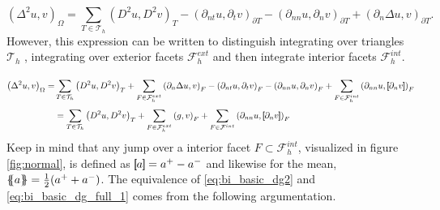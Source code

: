 \begin{equation}
\label{eq:bi_basic_dg2}
\left( \Delta  ^{2} u,v \right) _{\Omega } = \sum_{T \in  \mathcal{T} _{h}}^{}  \left( D^2u,D^2v \right) _{T } - \left(\partial _{nt} u, \partial _{t}v
\right)_{\partial T} - \left(\partial _{nn} u, \partial _{n}v \right)_{\partial T} + \left(\partial _{n} \Delta  u,v
\right)_{\partial T}.
\end{equation}
However, this expression can be written to distinguish integrating over triangles $\mathcal{T} _{h}$ , integrating over exterior facets $\mathcal{F} _{h}^{ext}$ and then integrate interior facets $\mathcal{F} _{h}^{int}$.

\begin{equation}
\label{eq:bi_basic_dg_full_1}
\begin{split}
\left( \Delta  ^{2} u, v \right) _{\Omega } =& \sum_{T \in  \mathcal{T} _{h}}^{} \left( D^2u, D^2v \right)_{T}  + \sum_{F \in \mathcal{F}_{h}^{ext}}  \left(\partial _{n} \Delta u, v  \right) _{F} - \left(\partial _{nt} u, \partial _{t} v \right) _{F}-
\left( \partial _{nn} u, \partial _{n} v \right)_{F} + \sum_{F \in \mathcal{F}_{h}  ^{int}}^{} \left(\partial _{nn} u , \jump{ \partial _{n} v }
\right)_{F} \\
& = \sum_{T \in  \mathcal{T} _{h}}^{} \left( D^2u, D^2v \right)_{T} + \sum_{F \in
\mathcal{F} ^{ext}_{h}}^{} \left(g, v  \right) _{F}
  + \sum_{F \in \mathcal{F}  ^{int}}^{} \left( \partial _{nn} u , \jump{ \partial_{n} v } \right)_{F}
\end{split}
\end{equation}
Keep in mind that any jump over a interior facet $F \subset \mathcal{F} _{h}^{int}   $, visualized in figure \ref{fig:normal}, is defined as $\left[\!\!\left[  a  \right]\!\!\right] =    a^{+} - a^{-} $
and likewise for the mean, $\left\{\!\!\left\{ a  \right\}\!\!\right\} = \frac{1}{2}(   a^{+}
+ a^{-})$.    The equivalence of \eqref{eq:bi_basic_dg2} and \eqref{eq:bi_basic_dg_full_1} comes from the following argumentation.

